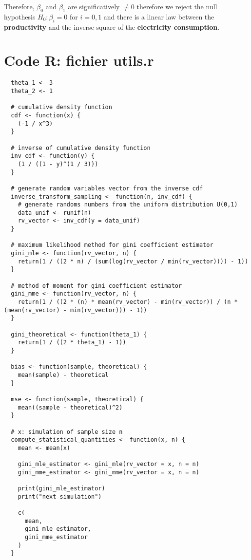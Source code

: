 \documentclass[10pt, a4paper, nofootinbib]{scrartcl}
\begin{document}
Therefore, $\beta_0$ and $\beta_1$ are significatively $\neq 0$ therefore we reject the null hypothesis $H_0: \beta_i = 0$ for $i = 0,1$ and there is a linear law between the \textbf{productivity} and the inverse square of the \textbf{electricity consumption}.

\newpage

\appendix
\appendixpage
\addappheadtotoc

\section{Code R: fichier utils.r}

\begin{verbatim}
  theta_1 <- 3
  theta_2 <- 1

  # cumulative density function
  cdf <- function(x) {
    (-1 / x^3)
  }

  # inverse of cumulative density function
  inv_cdf <- function(y) {
    (1 / ((1 - y)^(1 / 3)))
  }

  # generate random variables vector from the inverse cdf
  inverse_transform_sampling <- function(n, inv_cdf) {
    # generate randoms numbers from the uniform distribution U(0,1)
    data_unif <- runif(n)
    rv_vector <- inv_cdf(y = data_unif)
  }

  # maximum likelihood method for gini coefficient estimator
  gini_mle <- function(rv_vector, n) {
    return(1 / ((2 * n) / (sum(log(rv_vector / min(rv_vector)))) - 1))
  }

  # method of moment for gini coefficient estimator
  gini_mme <- function(rv_vector, n) {
    return(1 / ((2 * (n) * mean(rv_vector) - min(rv_vector)) / (n * (mean(rv_vector) - min(rv_vector))) - 1))
  }

  gini_theoretical <- function(theta_1) {
    return(1 / ((2 * theta_1) - 1))
  }

  bias <- function(sample, theoretical) {
    mean(sample) - theoretical
  }

  mse <- function(sample, theoretical) {
    mean((sample - theoretical)^2)
  }

  # x: simulation of sample size n
  compute_statistical_quantities <- function(x, n) {
    mean <- mean(x)

    gini_mle_estimator <- gini_mle(rv_vector = x, n = n)
    gini_mme_estimator <- gini_mme(rv_vector = x, n = n)

    print(gini_mle_estimator)
    print("next simulation")

    c(
      mean,
      gini_mle_estimator,
      gini_mme_estimator
    )
  }


\end{verbatim}
\end{document}
